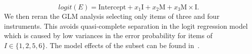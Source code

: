 \begin{equation}
	logit(E) =  \text{Intercept} + x_1 \text{I} + x_2 \text{M} + x_3 \text{M}\times\text{I} .
	\label{eq:logit_interactions}
\end{equation}
We then reran the GLM analysis selecting only items of three and four instruments. This avoids quasi-complete separation in the logit regression model which is caused by low variances in the error probability for items of $I \in \{1,2,5,6\}$. 
The model effects of the subset can be found in~\cite{stoeter13}.

